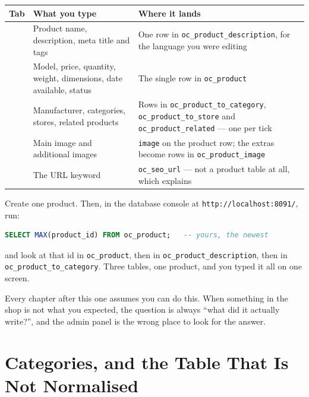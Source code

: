 \begin{longtable}{@{}L{2.6cm}L{5.4cm}L{6.8cm}@{}}
\toprule
{}
\textbf{Tab} & \textbf{What you type} & \textbf{Where it lands} \\
\midrule
\endhead
{} & Product name, description, meta title and tags & One row in
\texttt{oc\_product\_description}, for the language you were editing \\
 & Model, price, quantity, weight, dimensions, date available,
status & The single row in \texttt{oc\_product} \\
 & Manufacturer, categories, stores, related products & Rows in
\texttt{oc\_product\_to\_category}, \texttt{oc\_product\_to\_store} and
\texttt{oc\_product\_related} --- one per tick \\
 & Main image and additional images & \texttt{image} on the product
row; the extras become rows in \texttt{oc\_product\_image} \\
 & The URL keyword & \texttt{oc\_seo\_url} --- not a product table at
all, which  explains \\
\bottomrule
\end{longtable}

\begin{alertbox}
Create one product. Then, in the database console at
\texttt{http://localhost:8091/}, run:

\begin{lstlisting}[language=sql]
SELECT MAX(product_id) FROM oc_product;   -- yours, the newest
\end{lstlisting}

and look at that id in \texttt{oc\_product}, then in
\texttt{oc\_product\_description}, then in
\texttt{oc\_product\_to\_category}. Three tables, one product, and you typed it
all on one screen.

\smallskip
Every chapter after this one assumes you can do this. When something in the
shop is not what you expected, the question is always ``what did it actually
write?'', and the admin panel is the wrong place to look for the answer.
\end{alertbox}

\section{Categories, and the Table That Is Not Normalised}

